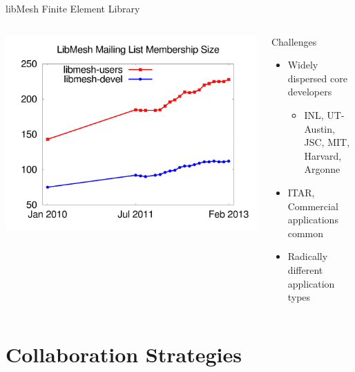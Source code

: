 \documentclass[mathserif]{beamer}
\begin{document}
\begin{frame}{libMesh Finite Element Library}
\begin{columns}
\includegraphics[width=\textwidth]{libmesh_mailinglists_membership}

\begin{block}{Challenges}
\begin{itemize}
\item Widely dispersed core developers
\begin{itemize}
\item INL, UT-Austin, JSC, MIT, Harvard, Argonne
\end{itemize}
\item ITAR, Commercial applications common
\item Radically different application types
\end{itemize}
\end{block}
\end{columns}

\end{frame}


\section{Collaboration Strategies}
\end{document}
